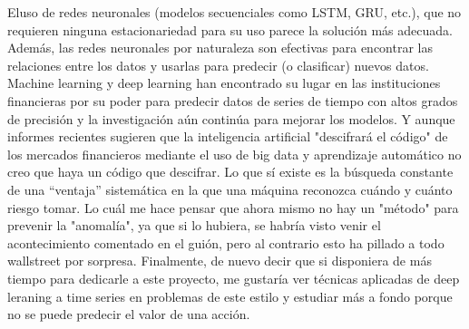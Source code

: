 \documentclass[12pt,twoside]{report}
\begin{document}
Eluso de redes neuronales (modelos secuenciales como LSTM, GRU, etc.), que no requieren ninguna estacionariedad para su uso parece la solución más adecuada. Además, las redes neuronales por naturaleza son efectivas para encontrar las relaciones entre los datos y usarlas para predecir (o clasificar) nuevos datos. Machine learning y deep learning han encontrado su lugar en las instituciones financieras por su poder para predecir datos de series de tiempo con altos grados de precisión y la investigación aún continúa para mejorar los modelos. Y aunque informes recientes sugieren que la inteligencia artificial "descifrará el código" de los mercados financieros mediante el uso de big data y aprendizaje automático \cite{crack} no creo que haya un código que descifrar. Lo que sí existe es la búsqueda constante de una “ventaja” sistemática en la que una máquina reconozca cuándo y cuánto riesgo tomar. Lo cuál me hace pensar que ahora mismo no hay un "método" para prevenir la "anomalía", ya que si lo hubiera, se habría visto venir el acontecimiento comentado en el guión, pero al contrario esto ha pillado a todo wallstreet por sorpresa. Finalmente, de nuevo decir que si disponiera de más tiempo para dedicarle a este proyecto, me gustaría ver técnicas aplicadas de deep leraning a time series en problemas de este estilo y estudiar más a fondo porque no se puede predecir el valor de una acción.
\medskip

\printbibliography[
heading=bibintoc,
title={Referencias}
]
\end{document}
